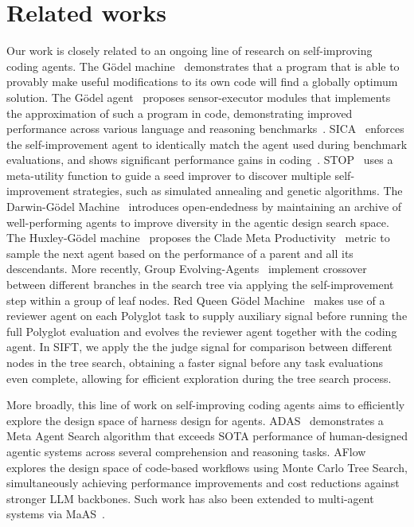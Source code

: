 \documentclass{article}
\begin{document}
\section{Related works}
Our work is closely related to an ongoing line of research on self-improving coding agents. The G\"odel machine~\citep{godelmachine} demonstrates that a program that is able to provably make useful modifications to its own code will find a globally optimum solution. The G\"odel agent~\citep{godelagent} proposes sensor-executor modules that implements the approximation of such a program in code, demonstrating improved performance across various language and reasoning benchmarks~\citep{dua2019dropreadingcomprehensionbenchmark, mmlu, gpqa, mgsm}. SICA~\citep{sica} enforces the self-improvement agent to identically match the agent used during benchmark evaluations, and shows significant performance gains in coding~\citep{jimenez2024swebench, jain2025livecodebench}. STOP~\citep{zelikman2024selftaught} uses a meta-utility function to guide a seed improver to discover multiple self-improvement strategies, such as simulated annealing and genetic algorithms. The Darwin-G\"odel Machine~\citep{dgm} introduces open-endedness by maintaining an archive of well-performing agents to improve diversity in the agentic design search space. The Huxley-G\"odel machine~\citep{hgm} proposes the Clade Meta Productivity~\citep{cmp_huxley} metric to sample the next agent based on the performance of a parent and all its descendants. More recently, Group Evolving-Agents~\citep{weng2026groupevolvingagentsopenendedselfimprovement} implement crossover between different branches in the search tree via applying the self-improvement step within a group of leaf nodes. Red Queen G\"odel Machine~\citep{iacob2026redqueengodelmachine} makes use of a reviewer agent on each Polyglot task to supply auxiliary signal before running the full Polyglot evaluation and evolves the reviewer agent together with the coding agent. In SIFT, we apply the the judge signal for comparison between different nodes in the tree search, obtaining a faster signal before any task evaluations even complete, allowing for efficient exploration during the tree search process.

More broadly, this line of work on self-improving coding agents aims to efficiently explore the design space of harness design for agents. ADAS~\citep{adas} demonstrates a Meta Agent Search algorithm that exceeds SOTA performance of human-designed agentic systems across several comprehension and reasoning tasks. AFlow~\citep{zhang2025aflow} explores the design space of code-based workflows using Monte Carlo Tree Search, simultaneously achieving performance improvements and cost reductions against stronger LLM backbones. Such work has also been extended to multi-agent systems via MaAS~\citep{maas}.
\end{document}
